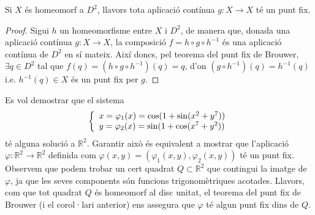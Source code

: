 \documentclass[../main.tex]{subfiles}
\begin{document}
\begin{coro}
\label{coro:puntfixbrouwer} Si $X$ és homeomorf a $D^2$, llavors tota aplicació contínua $g:X\rightarrow X$ té un punt fix.
\end{coro}
\begin{proof}
Sigui $h$ un homeomorfisme entre $X$ i $D^2$, de manera que, donada una aplicació contínua $g:X\rightarrow X$, la composició $f = h\circ g\circ h^{-1}$ és una aplicació contínua de $D^2$ en sí mateix. Així doncs, pel teorema del punt fix de Brouwer, $\exists q\in D^2$ tal que $f(q) = (h\circ g\circ h^{-1})(q) = q$, d'on $(g\circ h^{-1})(q) = h^{-1}(q)$ i.e. $h^{-1}(q)\in X$ és un punt fix per $g$.
\end{proof}

\begin{ej}
[Exercici 17]\label{exercici2.17} Es vol demostrar que el sistema
\begin{equation}
    \notag
    \left\{
    \begin{array}{ll}
        x = \varphi_1(x) = \cos(1+\sin(x^2+y^7)) \\
        y = \varphi_2(x) = \sin(1+\cos(x^7+y^2))
    \end{array}
    \right.
\end{equation}
té alguna solució a $\mathbb{R}^2$. Garantir això és equivalent a mostrar que l'aplicació $\varphi:\mathbb{R}^2\rightarrow\mathbb{R}^2$ definida com $\varphi(x,y) = (\varphi_1(x,y),\varphi_2(x,y))$ té un punt fix. Observem que podem trobar un cert quadrat $Q\subset \mathbb{R}^2$ que contingui la imatge de $\varphi$, ja que les seves components són funcions trigonomètriques acotades. Llavors, com que tot quadrat $Q$ és homeomorf al disc unitat, el teorema del punt fix de Brouwer (i el corol·lari anterior) ens assegura que $\varphi$ té algun punt fix dins de $Q$.
\end{ej}
\end{document}
